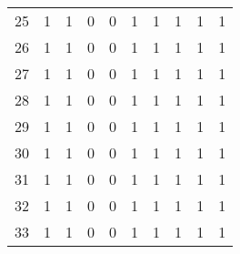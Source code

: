 \begin{longtable}{lrrrrrrrrr}
25    &                          1 &                             1 &                          0 &                        0 &                           1 &                        1 &                         1 &                            1 &                         1 \\
26    &                          1 &                             1 &                          0 &                        0 &                           1 &                        1 &                         1 &                            1 &                         1 \\
27    &                          1 &                             1 &                          0 &                        0 &                           1 &                        1 &                         1 &                            1 &                         1 \\
28    &                          1 &                             1 &                          0 &                        0 &                           1 &                        1 &                         1 &                            1 &                         1 \\
29    &                          1 &                             1 &                          0 &                        0 &                           1 &                        1 &                         1 &                            1 &                         1 \\
30    &                          1 &                             1 &                          0 &                        0 &                           1 &                        1 &                         1 &                            1 &                         1 \\
31    &                          1 &                             1 &                          0 &                        0 &                           1 &                        1 &                         1 &                            1 &                         1 \\
32    &                          1 &                             1 &                          0 &                        0 &                           1 &                        1 &                         1 &                            1 &                         1 \\
33    &                          1 &                             1 &                          0 &                        0 &                           1 &                        1 &                         1 &                            1 &                         1 \\

\end{longtable}
